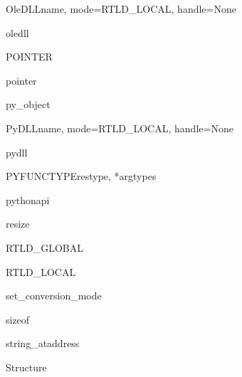 \begin{classdesc}{OleDLL}{name, mode=RTLD_LOCAL, handle=None}
\end{classdesc}

\begin{datadesc}{oledll}
\end{datadesc}

\begin{funcdesc}{POINTER}{}
\end{funcdesc}

\begin{funcdesc}{pointer}{}
\end{funcdesc}

\begin{classdesc}{py_object}{}
\end{classdesc}

\begin{classdesc}{PyDLL}{name, mode=RTLD_LOCAL, handle=None}
\end{classdesc}

\begin{datadesc}{pydll}{}
\end{datadesc}

\begin{funcdesc}{PYFUNCTYPE}{restype, *argtypes}
\end{funcdesc}

\begin{funcdesc}{pythonapi}{}
\end{funcdesc}

\begin{funcdesc}{resize}{}
\end{funcdesc}

\begin{datadesc}{RTLD_GLOBAL}
\end{datadesc}

\begin{datadesc}{RTLD_LOCAL}
\end{datadesc}

\begin{funcdesc}{set_conversion_mode}{}
\end{funcdesc}

\begin{funcdesc}{sizeof}{}
\end{funcdesc}

\begin{funcdesc}{string_at}{address}
\end{funcdesc}

\begin{classdesc}{Structure}{}
\end{classdesc}

